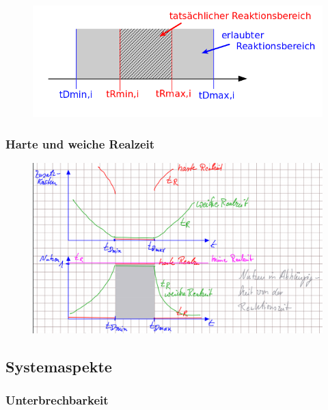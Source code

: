 \documentclass[12pt,a4paper,oneside,ngerman]{article}
\begin{document}
\begin{figure}[ht]
	\centering
	\includegraphics[scale=0.5]{umlet/Rechtzeitigkeitsbedingung.png}
\end{figure}


\subsubsection{Harte und weiche Realzeit}

\begin{figure}[H]
	\centering
	\includegraphics[scale=0.4]{umlet/harte_weiche_realzeit.png}
\end{figure}

\subsection{Systemaspekte}
\subsubsection{Unterbrechbarkeit}
\end{document}
